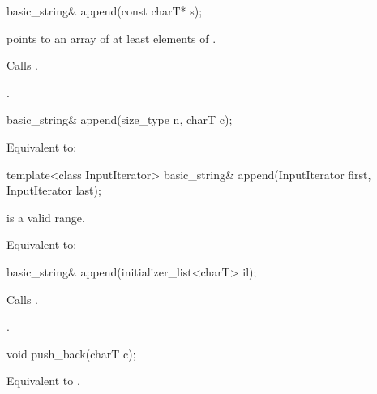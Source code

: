 %
\begin{itemdecl}
basic_string& append(const charT* s);
\end{itemdecl}

\begin{itemdescr}
\pnum
\requires {} points to an array of at least 
elements of .

\pnum
\effects Calls .

\pnum
\returns
{}.
\end{itemdescr}

%
\begin{itemdecl}
basic_string& append(size_type n, charT c);
\end{itemdecl}

\begin{itemdescr}
\pnum
\effects Equivalent to: 
\end{itemdescr}

%
\begin{itemdecl}
template<class InputIterator>
  basic_string& append(InputIterator first, InputIterator last);
\end{itemdecl}

\begin{itemdescr}
\pnum
\requires {} is a valid range.

\pnum
\effects Equivalent to: 
\end{itemdescr}

%
\begin{itemdecl}
basic_string& append(initializer_list<charT> il);
\end{itemdecl}

\begin{itemdescr}
\pnum
\effects Calls .

\pnum
\returns
{}.
\end{itemdescr}

%
\begin{itemdecl}
void push_back(charT c);
\end{itemdecl}

\begin{itemdescr}
\pnum
\effects
Equivalent to
.
\end{itemdescr}

